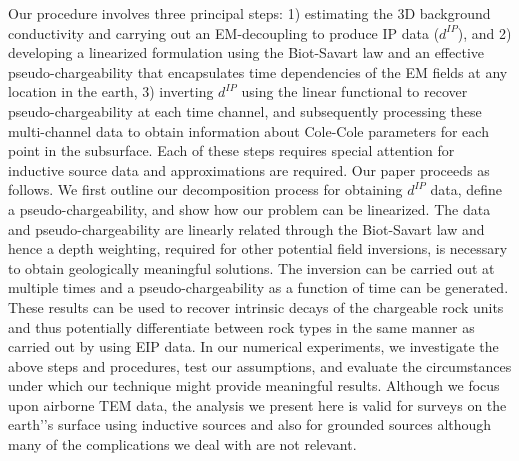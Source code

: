 \documentclass[extra,mreferee]{gji}
\newcommand{\dip}{d^{IP}}
\begin{document}
Our procedure involves three principal steps: 1) estimating the 3D background conductivity and carrying out an EM-decoupling to produce IP data ($\dip$), and 2) developing a linearized formulation using the Biot-Savart law and an effective pseudo-chargeability that encapsulates time dependencies of the EM fields at any location in the earth, 3) inverting $\dip$ using the linear functional to recover pseudo-chargeability at each time channel, and subsequently processing these multi-channel data to obtain information about Cole-Cole parameters for each point in the subsurface. Each of these steps requires special attention for inductive source data and approximations are required. 
Our paper proceeds as follows. We first outline our decomposition process for obtaining $\dip$ data, define a pseudo-chargeability, and show how our problem can be linearized.
The data and  pseudo-chargeability are linearly related through the Biot-Savart law and hence a depth weighting, required for other potential field inversions, is necessary to obtain geologically meaningful solutions. The inversion can be carried out at multiple times and a pseudo-chargeability as a function of time can be generated. These results can be used to recover intrinsic decays of the chargeable rock units and thus potentially differentiate between rock types in the same manner as carried out by \cite{Yuval1997} using EIP data. In our numerical experiments, we investigate the above steps and procedures, test our assumptions, and evaluate the circumstances under which our technique might provide meaningful results. Although  we focus upon airborne TEM data, the analysis we present here is valid for surveys on the earth’'s surface using inductive sources and also for grounded sources although many of the complications we deal with are not relevant. 
    
\end{document}

